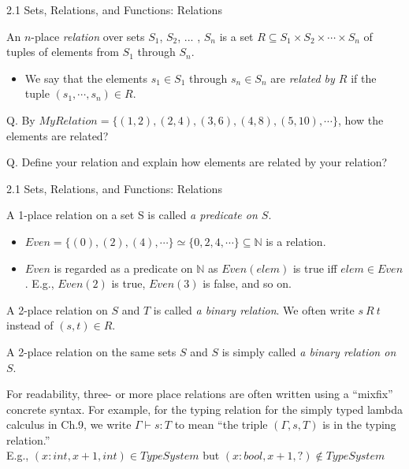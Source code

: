 \documentclass[table]{beamer}
\newcommand{\tyenv}{\Gamma}
\begin{document}
\begin{frame}[t]{2.1 Sets, Relations, and Functions: Relations} \vspace{10pt}

{\color{red} An $n$-place {\it relation} over sets $S_1$, $S_2$, ... , $S_n$} is a set $R\subseteq S_1\times S_2 \times \cdots \times S_n$ of tuples of elements from $S_1$ through $S_n$. 
\begin{itemize}
\item We say that the elements $s_1\in S_1$ through $s_n\in S_n$ are {\it \color{red} related by $R$} if the tuple $(s_1, \cdots, s_n) \in R$. 
\end{itemize}

\vspace{10pt}

Q. By $MyRelation = \{ (1,2), (2,4), (3,6), (4,8), (5,10), \cdots \}$, how the elements are related?

\vspace{10pt}

Q. Define your relation and explain how elements are related by your relation?


\end{frame}

\begin{frame}[t]{2.1 Sets, Relations, and Functions: Relations} %

A 1-place relation on a set S is called {\it \color{red} a predicate on $S$}. 
\begin{itemize}
\item $Even=\{(0),(2),(4),\cdots\}\simeq\{0,2,4,\cdots\}\subseteq \mathbb{N}$ is a relation.
\item $Even$ is regarded as a predicate on $\mathbb{N}$ as $Even(elem)$ is true iff $elem\in Even$. E.g., $Even(2)$ is true, $Even(3)$ is false, and so on.
\end{itemize}

\vspace{10pt}

A 2-place relation on $S$ and $T$ is called {\it \color{red} a binary relation}. We often write {\color{red} $s \ R \ t$} instead of $(s,t)\in R$.

\vspace{10pt}

A 2-place relation on the same sets $S$ and $S$ is simply called {\it \color{red} a binary relation on $S$}.

\vspace{10pt}

{\color{red} For readability}, three- or more place relations are often written using a ``mixfix'' concrete syntax. For example,
for the typing relation for the simply typed lambda calculus in Ch.9, we write {\color{red} $\tyenv \vdash s : T$} to mean ``the triple $(\tyenv,s,T)$ is in the typing relation.'' \\
E.g., $(x:int, x+1, int) \in TypeSystem$ but $(x:bool, x+1, ?) \not\in TypeSystem$

\end{frame}
\end{document}
